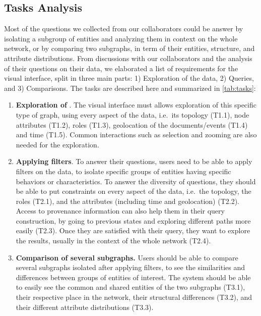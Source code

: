 \subsection{Tasks Analysis}

Most of the questions we collected from our collaborators could be answer by isolating a subgroup of entities and analyzing them in context on the whole network, or by comparing two subgraphs, in term of their entities, structure, and attribute distributions. From discussions with our collaborators and the analysis of their questions on their data, we elaborated a list of requirements for the visual interface, split in three main parts: 1) Exploration of the data, 2) Queries, and 3) Comparisons. The tasks are described here and summarized in \autoref{tab:tasks}:

\begin{enumerate}
    \item \textbf{Exploration of \model}. The visual interface must allows exploration of this specific type of graph, using every aspect of the data, i.e.\ its topology (T1.1), node attributes  (T1.2), roles (T1.3), geolocation of the documents/events (T1.4) and time (T1.5). Common interactions such as selection and zooming are also needed for the exploration.
    \item \textbf{Applying filters}. To answer their questions, users need to be able to apply filters on the data, to isolate specific groups of entities having specific behaviors or characteristics. To answer the diversity of questions, they should be able to put constraints on every aspect of the data, i.e.\ the topology, the roles (T2.1), and the attributes (including time and geolocation) (T2.2).
    Access to provenance information can also help them in their query construction, by going to previous states and exploring different paths more easily (T2.3). Once they are satisfied with their query, they want to explore the results, usually in the context of the whole network (T2.4).
    \item \textbf{Comparison of several subgraphs.} Users should be able to compare several subgraphs isolated after applying filters, to see the similarities and differences between groups of entities of interest. The system should be able to easily see the common and shared entities of the two subgraphs (T3.1), their respective place in the network, their structural differences (T3.2), and their different attribute distributions (T3.3).
\end{enumerate}





